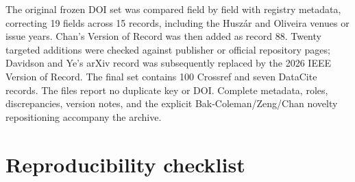 \documentclass[10pt,a4paper]{article}
\begin{document}
\begin{appendices}
The original frozen DOI set was compared field by field with registry metadata, correcting 19 fields across 15 records, including the Husz\'ar and Oliveira venues or issue years. Chan's Version of Record was then added as record 88. Twenty targeted additions were checked against publisher or official repository pages; Davidson and Ye's arXiv record was subsequently replaced by the 2026 IEEE Version of Record. The final set contains 100 Crossref and seven DataCite records. The files report no duplicate key or DOI. Complete metadata, roles, discrepancies, version notes, and the explicit Bak-Coleman/Zeng/Chan novelty repositioning accompany the archive.

\section{Reproducibility checklist}


\end{appendices}
\end{document}
